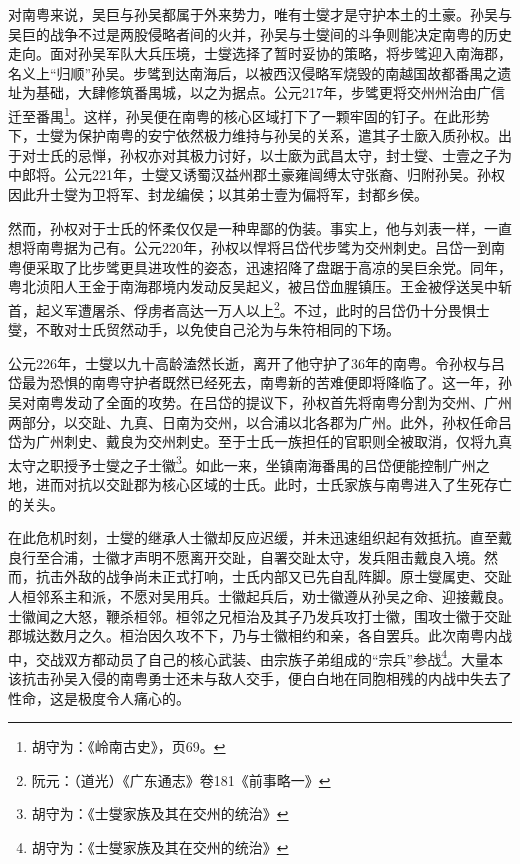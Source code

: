 对南粤来说，吴巨与孙吴都属于外来势力，唯有士燮才是守护本土的土豪。孙吴与吴巨的战争不过是两股侵略者间的火并，孙吴与士燮间的斗争则能决定南粤的历史走向。面对孙吴军队大兵压境，士燮选择了暂时妥协的策略，将步骘迎入南海郡，名义上“归顺”孙吴。步骘到达南海后，以被西汉侵略军烧毁的南越国故都番禺之遗址为基础，大肆修筑番禺城，以之为据点。公元217年，步骘更将交州州治由广信迁至番禺\footnote{胡守为：《岭南古史》，页69。}。这样，孙吴便在南粤的核心区域打下了一颗牢固的钉子。在此形势下，士燮为保护南粤的安宁依然极力维持与孙吴的关系，遣其子士廞入质孙权。出于对士氏的忌惮，孙权亦对其极力讨好，以士廞为武昌太守，封士燮、士壹之子为中郎将。公元221年，士燮又诱蜀汉益州郡土豪雍闿缚太守张裔、归附孙吴。孙权因此升士燮为卫将军、封龙编侯；以其弟士壹为偏将军，封都乡侯。

然而，孙权对于士氏的怀柔仅仅是一种卑鄙的伪装。事实上，他与刘表一样，一直想将南粤据为己有。公元220年，孙权以悍将吕岱代步骘为交州刺史。吕岱一到南粤便采取了比步骘更具进攻性的姿态，迅速招降了盘踞于高凉的吴巨余党。同年，粤北浈阳人王金于南海郡境内发动反吴起义，被吕岱血腥镇压。王金被俘送吴中斩首，起义军遭屠杀、俘虏者高达一万人以上\footnote{阮元：（道光）《广东通志》卷181《前事略一》}。不过，此时的吕岱仍十分畏惧士燮，不敢对士氏贸然动手，以免使自己沦为与朱符相同的下场。

公元226年，士燮以九十高龄溘然长逝，离开了他守护了36年的南粤。令孙权与吕岱最为恐惧的南粤守护者既然已经死去，南粤新的苦难便即将降临了。这一年，孙吴对南粤发动了全面的攻势。在吕岱的提议下，孙权首先将南粤分割为交州、广州两部分，以交趾、九真、日南为交州，以合浦以北各郡为广州。此外，孙权任命吕岱为广州刺史、戴良为交州刺史。至于士氏一族担任的官职则全被取消，仅将九真太守之职授予士燮之子士徽\footnote{胡守为：《士燮家族及其在交州的统治》}。如此一来，坐镇南海番禺的吕岱便能控制广州之地，进而对抗以交趾郡为核心区域的士氏。此时，士氏家族与南粤进入了生死存亡的关头。

在此危机时刻，士燮的继承人士徽却反应迟缓，并未迅速组织起有效抵抗。直至戴良行至合浦，士徽才声明不愿离开交趾，自署交趾太守，发兵阻击戴良入境。然而，抗击外敌的战争尚未正式打响，士氏内部又已先自乱阵脚。原士燮属吏、交趾人桓邻系主和派，不愿对吴用兵。士徽起兵后，劝士徽遵从孙吴之命、迎接戴良。士徽闻之大怒，鞭杀桓邻。桓邻之兄桓治及其子乃发兵攻打士徽，围攻士徽于交趾郡城达数月之久。桓治因久攻不下，乃与士徽相约和亲，各自罢兵。此次南粤内战中，交战双方都动员了自己的核心武装、由宗族子弟组成的“宗兵”参战\footnote{胡守为：《士燮家族及其在交州的统治》}。大量本该抗击孙吴入侵的南粤勇士还未与敌人交手，便白白地在同胞相残的内战中失去了性命，这是极度令人痛心的。

